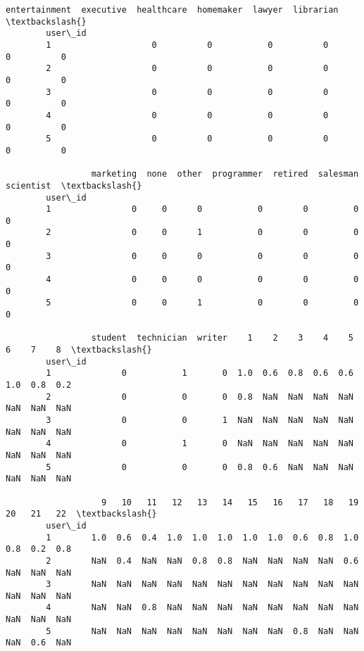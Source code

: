 \documentclass[11pt]{article}
\begin{document}
\begin{Verbatim}[commandchars=\\\{\}]
                 entertainment  executive  healthcare  homemaker  lawyer  librarian  \textbackslash{}
        user\_id                                                                       
        1                    0          0           0          0       0          0   
        2                    0          0           0          0       0          0   
        3                    0          0           0          0       0          0   
        4                    0          0           0          0       0          0   
        5                    0          0           0          0       0          0   
        
                 marketing  none  other  programmer  retired  salesman  scientist  \textbackslash{}
        user\_id                                                                     
        1                0     0      0           0        0         0          0   
        2                0     0      1           0        0         0          0   
        3                0     0      0           0        0         0          0   
        4                0     0      0           0        0         0          0   
        5                0     0      1           0        0         0          0   
        
                 student  technician  writer    1    2    3    4    5    6    7    8  \textbackslash{}
        user\_id                                                                        
        1              0           1       0  1.0  0.6  0.8  0.6  0.6  1.0  0.8  0.2   
        2              0           0       0  0.8  NaN  NaN  NaN  NaN  NaN  NaN  NaN   
        3              0           0       1  NaN  NaN  NaN  NaN  NaN  NaN  NaN  NaN   
        4              0           1       0  NaN  NaN  NaN  NaN  NaN  NaN  NaN  NaN   
        5              0           0       0  0.8  0.6  NaN  NaN  NaN  NaN  NaN  NaN   
        
                   9   10   11   12   13   14   15   16   17   18   19   20   21   22  \textbackslash{}
        user\_id                                                                         
        1        1.0  0.6  0.4  1.0  1.0  1.0  1.0  1.0  0.6  0.8  1.0  0.8  0.2  0.8   
        2        NaN  0.4  NaN  NaN  0.8  0.8  NaN  NaN  NaN  NaN  0.6  NaN  NaN  NaN   
        3        NaN  NaN  NaN  NaN  NaN  NaN  NaN  NaN  NaN  NaN  NaN  NaN  NaN  NaN   
        4        NaN  NaN  0.8  NaN  NaN  NaN  NaN  NaN  NaN  NaN  NaN  NaN  NaN  NaN   
        5        NaN  NaN  NaN  NaN  NaN  NaN  NaN  NaN  0.8  NaN  NaN  NaN  0.6  NaN   
        

\end{Verbatim}
\end{document}
